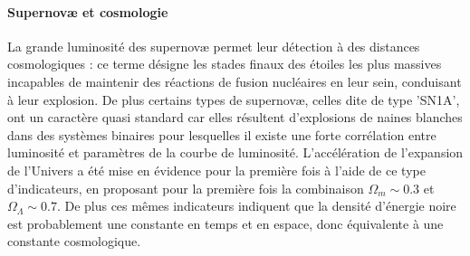 \paragraph{Supernovæ et cosmologie}
La grande luminosité des supernovæ permet leur détection à des distances cosmologiques : ce terme désigne les stades finaux des étoiles les plus massives incapables de maintenir des réactions de fusion nucléaires en leur sein, conduisant à leur explosion. De plus certains types de supernovæ, celles dite de type 'SN1A', ont un caractère quasi standard car elles résultent d'explosions de naines blanches dans des systèmes binaires pour lesquelles il existe une forte corrélation entre luminosité et paramètres de la courbe de luminosité. L'accélération  de l'expansion de l'Univers a été mise en évidence pour la première fois à l'aide de ce type d'indicateurs, en proposant pour la première fois la combinaison $\Omega_m\sim0.3$ et $\Omega_\Lambda\sim0.7$. De plus ces mêmes indicateurs indiquent que la densité d'énergie noire est probablement une constante en temps et en espace, donc équivalente à une constante cosmologique.


